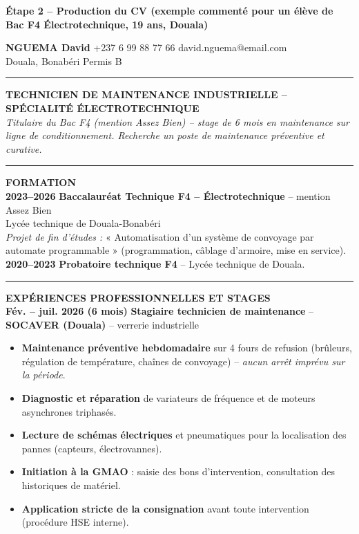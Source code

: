 \documentclass[11pt]{article}
\begin{document}
\textbf{Étape 2 -- Production du CV (exemple commenté pour un élève de Bac F4 Électrotechnique, 19 ans, Douala)}

\begin{exemplebox}
\textbf{NGUEMA David} \hfill +237 6 99 88 77 66 \hfill david.nguema@email.com \\
Douala, Bonabéri \hfill Permis B \\
\rule{\linewidth}{0.5pt}
\textbf{TECHNICIEN DE MAINTENANCE INDUSTRIELLE -- SPÉCIALITÉ ÉLECTROTECHNIQUE} \\
\emph{Titulaire du Bac F4 (mention Assez Bien) -- stage de 6 mois en maintenance sur ligne de conditionnement. Recherche un poste de maintenance préventive et curative.}
\rule{\linewidth}{0.5pt}
\textbf{FORMATION} \\
\textbf{2023--2026} \hfill \textbf{Baccalauréat Technique F4 -- Électrotechnique} -- mention Assez Bien \\
Lycée technique de Douala-Bonabéri \\
\textit{Projet de fin d'études :} « Automatisation d'un système de convoyage par automate programmable » (programmation, câblage d'armoire, mise en service). \\
\textbf{2020--2023} \hfill \textbf{Probatoire technique F4} -- Lycée technique de Douala.
\rule{\linewidth}{0.5pt}
\textbf{EXPÉRIENCES PROFESSIONNELLES ET STAGES} \\
\textbf{Fév. -- juil. 2026 (6 mois)} \hfill \textbf{Stagiaire technicien de maintenance} -- \textbf{SOCAVER (Douala)} -- verrerie industrielle \\
\begin{itemize}
    \item \textbf{Maintenance préventive hebdomadaire} sur 4 fours de refusion (brûleurs, régulation de température, chaînes de convoyage) -- \emph{aucun arrêt imprévu sur la période}.
    \item \textbf{Diagnostic et réparation} de variateurs de fréquence et de moteurs asynchrones triphasés.
    \item \textbf{Lecture de schémas électriques} et pneumatiques pour la localisation des pannes (capteurs, électrovannes).
    \item \textbf{Initiation à la GMAO} : saisie des bons d'intervention, consultation des historiques de matériel.
    \item \textbf{Application stricte de la consignation} avant toute intervention (procédure HSE interne).
\end{itemize}

\end{exemplebox}
\end{document}
